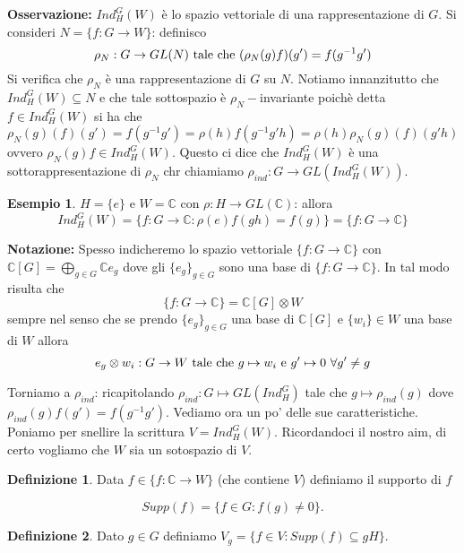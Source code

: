\documentclass[11pt]{article}
\theoremstyle{plain}
\theoremstyle{definition}
\newtheorem{defn}{Definizione}[section]
\newtheorem{exmp}{Esempio}[section]
\theoremstyle{remark}
\newcommand{\C}{\mathbb{C}}
\begin{document}
\textbf{Osservazione:} $Ind_H^G(W)$ è lo spazio vettoriale di una rappresentazione di $G$.
Si consideri $N=\{f:G\rightarrow W\}$: definisco
\[\rho_N:G\rightarrow GL(N) \textup{ tale che }(\rho_N(g)f)(g')=f(g^{-1}g')\]
Si verifica che $\rho_N$ è una rappresentazione di $G$ su $N$. Notiamo innanzitutto che $Ind_H^G(W)\subseteq N$ e che tale sottospazio è $\rho_N-$invariante poichè detta $f\in Ind_H^G(W)$ si ha che
\[ \rho_N(g)(f)(g')=f(g^{-1}g')=\rho(h)f(g^{-1}g'h)=\rho(h)\rho_N(g)(f)(g'h)\]
ovvero $\rho_N(g)f\in Ind_H^G(W)$. Questo ci dice che $Ind_H^G(W)$ è una sottorappresentazione di $\rho_N$ chr chiamiamo $\rho_{ind}:G\rightarrow GL(Ind_H^G(W))$.

\begin{exmp}
$H=\{e\}$ e $W=\C$ con $\rho:H\rightarrow GL(\C)$: allora
\[Ind_H^G(W)=\{f:G\rightarrow \C:\rho(e)f(gh)=f(g)\}=\{f:G\rightarrow \C\}\]
\end{exmp}

\textbf{Notazione:} Spesso indicheremo lo spazio vettoriale $\{f:G\rightarrow \C\}$ con $\C[G]=\bigoplus_{g\in G}\C e_g$ dove gli $\{e_g\}_{g\in G}$ sono una base di $\{f:G\rightarrow \C\}$. 
In tal modo risulta che 
\[\{f:G\rightarrow \C\}=\C[G]\otimes W\]
sempre nel senso che se prendo $\{e_g\}_{g\in G}$ una base di $\C[G]$ e $\{w_i\}\in W$ una base di $W$ allora 
\[e_g\otimes w_i:G\rightarrow W \textup{ tale che } g\mapsto w_i \textup{ e } g'\mapsto 0\ \forall g'\neq g\]

Torniamo a $\rho_{ind}$: ricapitolando $\rho_{ind}:G\mapsto GL(Ind_H^G)$ tale che $g\mapsto \rho_{ind}(g)$ dove $\rho_{ind}(g)f(g')=f(g^{-1}g')$. Vediamo ora un po' delle sue caratteristiche. Poniamo per snellire la scrittura $V=Ind_H^G(W)$. Ricordandoci il nostro aim, di certo vogliamo che $W$ sia un sotospazio di $V$.

\begin{defn}
Data $f\in \{f:\C\rightarrow W\}$ (che contiene $V$) definiamo il supporto di $f$ 

\[Supp(f)=\{f\in G:f(g)\neq 0\}.\]
\end{defn}

\begin{defn}
Dato $g\in G$ definiamo $V_g=\{f\in V : Supp(f)\subseteq gH \}$.
\end{defn}
\end{document}
